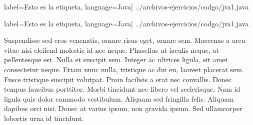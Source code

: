 \noindent\begin{minipage}{.45\textwidth}

\lstset{style=colorBB, style=colorA, inputencoding=utf8/latin1}
 label=Esto es la etiqueta, language=Java] {../archivos-ejercicios/codgo/jva1.java}

\end{minipage}\hfill
\begin{minipage}{.45\textwidth}

\lstset{style=colorBB, style=colorA, inputencoding=utf8/latin1}
 label=Esto es la etiqueta, language=Java] {../archivos-ejercicios/codgo/jva1.java}

\end{minipage}
Suspendisse sed eros venenatis, ornare risus eget, ornare sem. Maecenas a arcu vitae nisi eleifend molestie id nec neque. Phasellus ut iaculis neque, at pellentesque est. Nulla et suscipit sem. Integer ac ultrices ligula, sit amet consectetur neque. Etiam nunc nulla, tristique ac dui eu, laoreet placerat sem. Fusce tristique suscipit volutpat. Proin facilisis a erat nec convallis. Donec tempus faucibus porttitor. Morbi tincidunt nec libero vel scelerisque. Nam id ligula quis dolor commodo vestibulum. Aliquam sed fringilla felis. Aliquam dapibus orci nisi. Donec at varius ipsum, non gravida ipsum. Sed ullamcorper lobortis urna id tincidunt.
